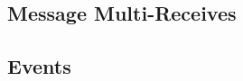 
\subsection{Message Multi-Receives}
\label{sec:multi-receive}

\subsection{Events}
\label{sec:events}


